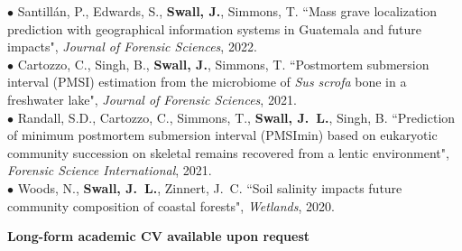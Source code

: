 \documentclass[11pt]{article}
\begin{document}
$\bullet$ Santillán, P., Edwards, S., \textbf{Swall, J.}, Simmons, T. ``Mass
grave localization prediction with geographical information systems in
Guatemala and future impacts", \textit{Journal of Forensic Sciences}, 2022.\\
$\bullet$ Cartozzo, C., Singh, B., \textbf{Swall, J.},  Simmons, T.
``Postmortem submersion interval (PMSI) estimation from the microbiome of
\textit{Sus scrofa} bone in a freshwater lake", \textit{Journal of
Forensic Sciences}, 2021.\\
$\bullet$ Randall, S.D., Cartozzo, C., Simmons, T., \textbf{Swall, J.~L.},
Singh, B. ``Prediction of minimum postmortem submersion interval (PMSImin)
based on eukaryotic community succession on skeletal remains recovered from
a lentic environment", \textit{Forensic Science International}, 2021.\\
$\bullet$ Woods, N., \textbf{Swall, J.~L.}, Zinnert, J.~C. ``Soil salinity
  impacts future community composition of coastal forests", \textit{Wetlands},
  2020.




\vspace*{0.3in}
\textbf{Long-form academic CV available upon request}
\end{document}
